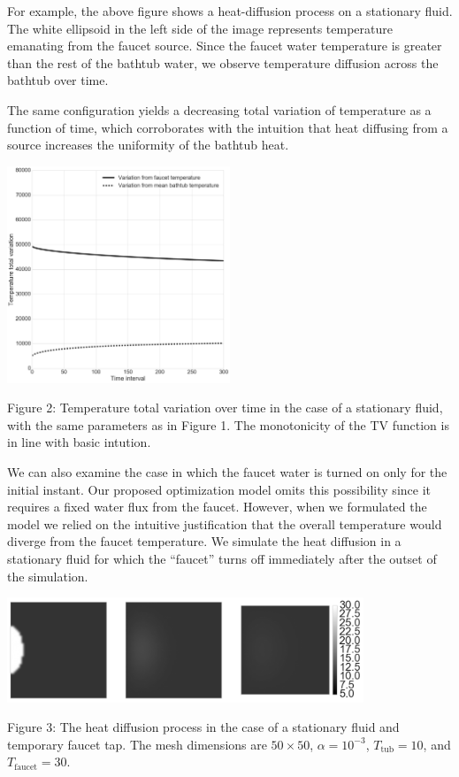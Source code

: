 \documentclass[12pt]{amsart}
\begin{document}
For example, the above figure shows a heat-diffusion process on a stationary
fluid. The white ellipsoid in the left side of the image represents temperature
emanating from the faucet source. Since the faucet water temperature is greater
than the rest of the bathtub water, we observe temperature diffusion across the
bathtub over time.

The same configuration yields a decreasing total variation of temperature as a function
of time, which corroborates with the intuition that heat diffusing from a source
increases the uniformity of the bathtub heat.

\begin{center}
    \includegraphics[width=0.5\textwidth]{../plots/tv-01.png}

    \justify
    \footnotesize{
    Figure 2: Temperature total variation over time in the case of a stationary
    fluid, with the same parameters as in Figure 1. The monotonicity of the TV
function is in line with basic intution.}
\end{center}

We can also examine the case in which the faucet water is turned on only for the
initial instant. Our proposed optimization model omits this possibility since it
requires a fixed water flux from the faucet. However, when we formulated the
model we relied on the intuitive justification that the overall temperature
would diverge from the faucet temperature. We simulate the heat diffusion in a
stationary fluid for which the ``faucet'' turns off immediately after the outset
of the simulation. 

\begin{center}
    \includegraphics[width=0.8\textwidth]{../plots/diffusion-02.png}

    \justify
    \footnotesize{
    Figure 3: The heat diffusion process in the case of a stationary fluid and
    temporary faucet tap. The mesh dimensions are $50 \times 50$, $\alpha =
    10^{-3}$, $T_{\mathrm{tub}} = 10$, and $T_{\mathrm{faucet}} = 30$.}
\end{center}
\end{document}
